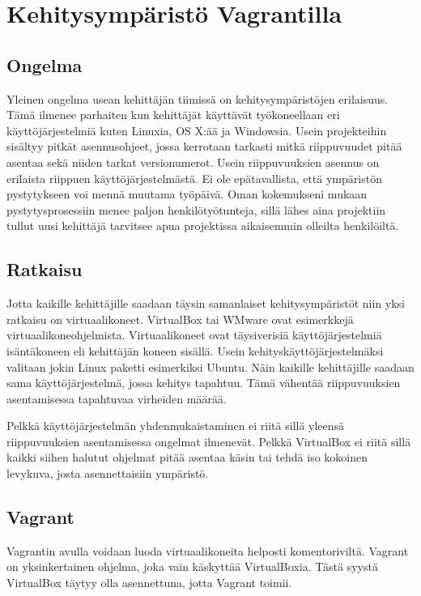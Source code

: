 \chapter{Kehitysympäristö Vagrantilla}

\section{Ongelma}
Yleinen ongelma usean kehittäjän tiimissä on kehitysympäristöjen erilaisuus. Tämä ilmenee parhaiten kun kehittäjät käyttävät työkoneellaan eri käyttöjärjestelmiä kuten Linuxia, OS X:ää ja Windowsia. Usein projekteihin sisältyy pitkät asennusohjeet, jossa kerrotaan tarkasti mitkä riippuvuudet pitää asentaa sekä niiden tarkat versionumerot. Usein riippuvuuksien asennus on erilaista riippuen käyttöjärjestelmästä. Ei ole epätavallista, että ympäristön pystytykseen voi mennä muutama työpäivä. Oman kokemukseni mukaan pystytysprosessiin menee paljon henkilötyötunteja, sillä lähes aina projektiin tullut uusi kehittäjä tarvitsee apua projektissa aikaisemmin olleilta henkilöiltä.

\section{Ratkaisu}
Jotta kaikille kehittäjille saadaan täysin samanlaiset kehitysympäristöt niin yksi ratkaisu on virtuaalikoneet. VirtualBox tai WMware ovat esimerkkejä virtuaalikoneohjelmista. Virtuaalikoneet ovat täysiverisiä käyttöjärjestelmiä isäntäkoneen eli kehittäjän koneen sisällä. Usein kehityskäyttöjärjestelmäksi valitaan jokin Linux paketti esimerkiksi Ubuntu. Näin kaikille kehittäjille saadaan sama käyttöjärjestelmä, jossa kehitys tapahtuu. Tämä vähentää riippuvuuksien asentamisessa tapahtuvaa virheiden määrää.

Pelkkä käyttöjärjestelmän yhdenmukaistaminen ei riitä sillä yleensä riippuvuuksien asentamisessa ongelmat ilmenevät. Pelkkä VirtualBox ei riitä sillä kaikki siihen halutut ohjelmat pitää asentaa käsin tai tehdä iso kokoinen levykuva, josta asennettaisiin ympäristö.

\section{Vagrant}
Vagrantin avulla voidaan luoda virtuaalikoneita helposti komentoriviltä. Vagrant on yksinkertainen ohjelma, joka vain käskyttää VirtualBoxia. Tästä syystä VirtualBox täytyy olla asennettuna, jotta Vagrant toimii.

